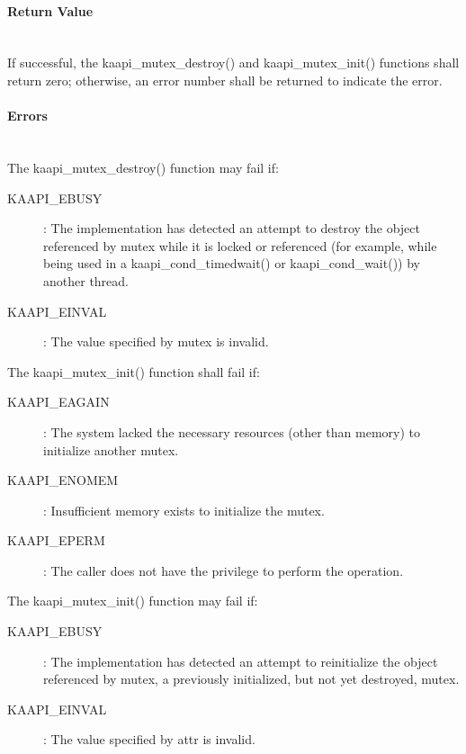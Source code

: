 \begin{description}
\paragraph{Return Value}~\\
If successful, the kaapi\_mutex\_destroy() and kaapi\_mutex\_init() functions
shall return zero; otherwise, an error number shall be returned to indicate
the error.

\paragraph{Errors}~\\
The kaapi\_mutex\_destroy() function may fail if:

\begin{description}
\item [KAAPI\_EBUSY]: The implementation has detected an attempt to destroy
  the object referenced by mutex while it is locked or referenced (for
  example, while being used in a kaapi\_cond\_timedwait() or
  kaapi\_cond\_wait()) by another thread.
\item [KAAPI\_EINVAL]: The value specified by mutex is invalid.
\end{description}

The kaapi\_mutex\_init() function shall fail if:

\begin{description}
\item [KAAPI\_EAGAIN]: The system lacked the necessary resources (other than
  memory) to initialize another mutex.
\item [KAAPI\_ENOMEM]: Insufficient memory exists to initialize the mutex.
\item [KAAPI\_EPERM]: The caller does not have the privilege to perform the
  operation.
\end{description}

The kaapi\_mutex\_init() function may fail if:

\begin{description}
\item [KAAPI\_EBUSY]: The implementation has detected an attempt to
  reinitialize the object referenced by mutex, a previously initialized, but
  not yet destroyed, mutex.
\item [KAAPI\_EINVAL]: The value specified by attr is invalid.
\end{description}
\end{description}


